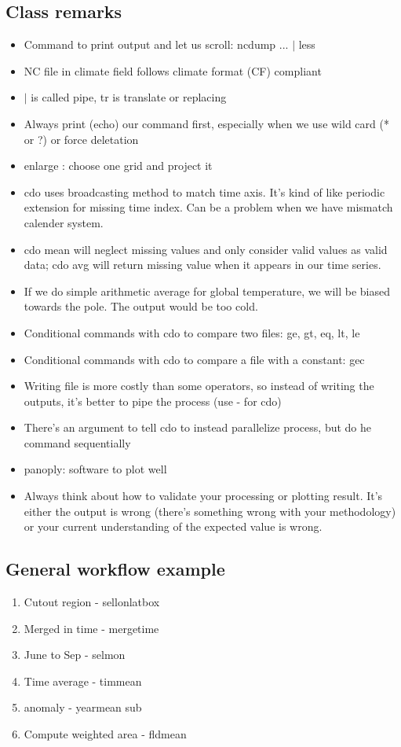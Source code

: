 \documentclass{article}
\begin{document}
\subsection{Class remarks}
\begin{itemize}
    \item Command to print output and let us scroll: ncdump ... $\vert$ less 
    \item NC file in climate field follows climate format (CF) compliant
    \item $\vert$ is called pipe, tr is translate or replacing
    \item Always print (echo) our command first, especially when we use wild card (* or ?) or force deletation
    \item enlarge : choose one grid and project it
    \item cdo uses broadcasting method to match time axis. It's kind of like periodic extension for missing time index. Can be a problem when we have mismatch calender system.
    \item cdo mean will neglect missing values and only consider valid values as valid data; cdo avg will return missing value when it appears in our time series.
    \item If we do simple arithmetic average for global temperature, we will be biased towards the pole. The output would be too cold.
    \item Conditional commands with cdo to compare two files: ge, gt, eq, lt, le
    \item Conditional commands with cdo to compare a file with a constant: gec
    \item Writing file is more costly than some operators, so instead of writing the outputs, it's better to pipe the process (use - for cdo)
    \item There's an argument to tell cdo to instead parallelize process, but do he command sequentially
    \item panoply: software to plot well
    \item Always think about how to validate your processing or plotting result. It's either the output is wrong (there's something wrong with your methodology) or your current understanding of the expected value is wrong.
\end{itemize}

\subsection{General workflow example}
\begin{enumerate}
    \item Cutout region - sellonlatbox
    \item Merged in time - mergetime
    \item June to Sep - selmon
    \item Time average - timmean
    \item anomaly - yearmean sub
    \item Compute weighted area - fldmean
\end{enumerate}
\end{document}
